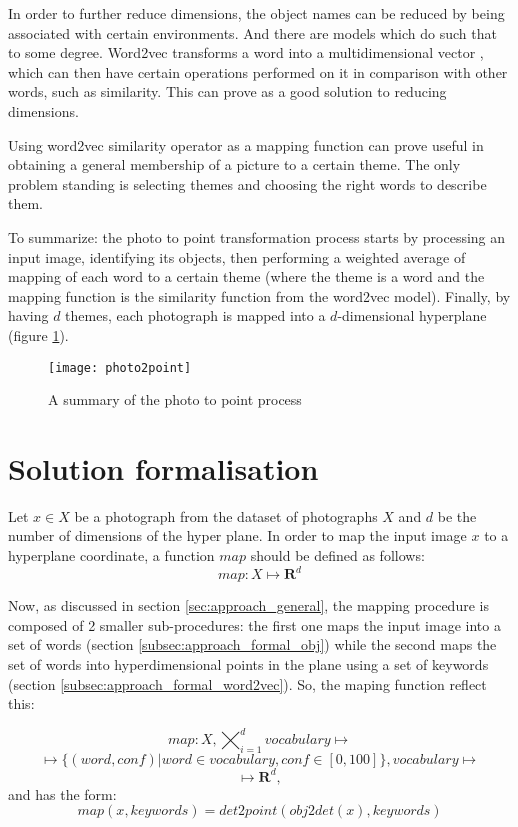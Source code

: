 In order to further reduce dimensions, the object names can be reduced by being associated with certain environments. And there are models which do such that to some degree. Word2vec transforms a word into a multidimensional vector \cite{word2vec}, which can then have certain operations performed on it in comparison with other words, such as similarity. This can prove as a good solution to reducing dimensions.

Using word2vec similarity operator as a mapping function can prove useful in obtaining a general membership of a picture to a certain theme. The only problem standing is selecting themes and choosing the right words to describe them.

To summarize: the photo to point transformation process starts by processing an input image, identifying its objects, then performing a weighted average of mapping of each word to a certain theme (where the theme is a word and the mapping function is the similarity function from the word2vec model). Finally, by having $d$ themes, each photograph is mapped into a $d$-dimensional hyperplane (figure \ref{fig:photo2point}).

\begin{figure}[b!]
\centering
\texttt{[image: photo2point]}
\caption{A summary of the photo to point process}
\label{fig:photo2point}
\end{figure}

\section{Solution formalisation}
\label{sec:approach_formal}

Let $x \in X$ be a photograph from the dataset of photographs $X$ and $d$ be the number of dimensions of the hyper plane. In order to map the input image $x$ to a hyperplane coordinate, a function $map$ should be defined as follows:
$$ map : X \mapsto \textbf{R}^{d} $$

Now, as discussed in section \ref{sec:approach_general}, the mapping procedure is composed of 2 smaller sub-procedures: the first one maps the input image into a set of words (section \ref{subsec:approach_formal_obj}) while the second maps the set of words into hyperdimensional points in the plane using a set of keywords (section \ref{subsec:approach_formal_word2vec}). So, the maping function reflect this:

$$ map : X, \bigtimes_{i=1}^{d}{vocabulary} \mapsto $$ $$ \mapsto \{(word, conf) | word \in vocabulary, conf \in [0, 100]\}, vocabulary \mapsto $$ $$ \mapsto \textbf{R}^{d} ,$$
and has the form:
$$ map(x, keywords) = det2point(obj2det(x), keywords) $$

